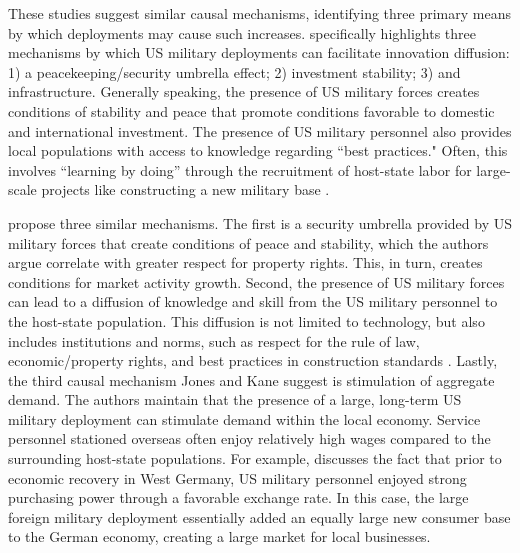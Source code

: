 \documentclass[12pt]{article}
\begin{document}
\begin{doublespace}
These studies suggest similar causal mechanisms, identifying three primary means by which deployments may cause such increases.  specifically highlights three mechanisms by which US military deployments can facilitate innovation diffusion: 1) a peacekeeping/security umbrella effect; 2) investment stability; 3) and infrastructure. Generally speaking, the presence of US military forces creates conditions of stability and peace that promote conditions favorable to domestic and international investment. The presence of US military personnel also provides local populations with access to knowledge regarding ``best practices." Often, this involves ``learning by doing'' through the recruitment of host-state labor for large-scale projects like constructing a new military base \cite[4]{kane2012development}. 

 propose three similar mechanisms. The first is a security umbrella provided by US military forces that create conditions of peace and stability, which the authors argue correlate with greater respect for property rights. This, in turn, creates conditions for market activity growth. Second, the presence of US military forces can lead to a diffusion of knowledge and skill from the US military personnel to the host-state population. This diffusion is not limited to technology, but also includes institutions and norms, such as respect for the rule of law, economic/property rights, and best practices in construction standards \cite[228]{jones2012us}. Lastly, the third causal mechanism Jones and Kane suggest is stimulation of aggregate demand. The authors maintain that the presence of a large, long-term US military deployment can stimulate demand within the local economy. Service personnel stationed overseas often enjoy relatively high wages compared to the surrounding host-state populations. For example,  discusses the fact that prior to economic recovery in West Germany, US military personnel enjoyed strong purchasing power through a favorable exchange rate. In this case, the large foreign military deployment essentially added an equally large new consumer base to the German economy, creating a large market for local businesses.


\end{doublespace}
\end{document}
